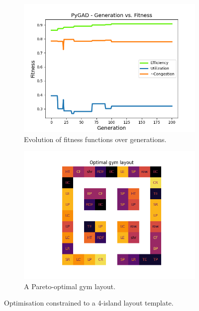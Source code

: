 \documentclass[9pt]{pnas-new}
\begin{document}
\begin{figure}[H]
	\begin{subfigure}{0.495\linewidth}
        \centering
        \includegraphics[width=\textwidth]{2x2fitness.png}
        \caption{Evolution of fitness functions over generations.}\label{fig:2x2fitness}
    \end{subfigure}
    \begin{subfigure}{0.495\linewidth}
        \centering
        \includegraphics[width=\textwidth]{2x2_layout.png}
        \caption{A Pareto-optimal gym layout.}\label{fig:2x2_layout}
    \end{subfigure}
    \caption{Optimisation constrained to a 4-island layout template.}\label{fig:secondTest}
\end{figure}
\end{document}
